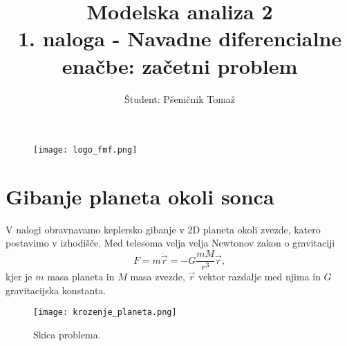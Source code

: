 \documentclass[12pt,a4paper]{article}
\title{\textbf{Modelska analiza 2} \\ 1. naloga - Navadne diferencialne enačbe: začetni problem \\}
\author{Študent: Pšeničnik Tomaž}
\begin{document}

	\begin{figure} [h]
  \centering
  \texttt{[image: logo\_fmf.png]}
  \maketitle
\end{figure}
	
	
	
	\newpage
	
	
	
\section*{Gibanje planeta okoli sonca}

V nalogi obravnavamo keplersko gibanje v 2D planeta okoli zvezde, katero postavimo v izhodišče. Med telesoma velja velja Newtonov zakon o gravitaciji
\begin{equation} \label{eq:gravity}
F=m \ddot{\vec{r}}= -G \frac{mM}{r^{3}} \vec{r},
\end{equation}
kjer je  $m$ masa planeta in $M$ masa zvezde, $\vec{r}$ vektor razdalje med njima in $G$ gravitacijska konstanta.

\begin{figure}[H]
    \centering
        \texttt{[image: krozenje\_planeta.png]}
    \caption{Skica problema.} \label{fig:slika1}
\end{figure}
\end{document}
